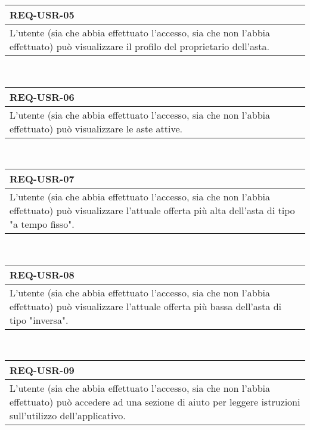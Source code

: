                 \begin{tabular}{|p{}|}
                    \hline
                    \multicolumn{1}{|l|}{\cellcolor{head}\textbf{REQ-USR-05}} \\
                    \hline
                    L'utente (sia che abbia effettuato l'accesso, sia che non l'abbia effettuato) può visualizzare il profilo del proprietario dell'asta. \\
                    \hline
                \end{tabular} \smallskip \\
                \begin{tabular}{|p{}|}
                    \hline
                    \multicolumn{1}{|l|}{\cellcolor{head}\textbf{REQ-USR-06}} \\
                    \hline
                    L'utente (sia che abbia effettuato l'accesso, sia che non l'abbia effettuato) può visualizzare le aste attive. \\
                    \hline
                \end{tabular} \smallskip \\
                \begin{tabular}{|p{}|}
                    \hline
                    \multicolumn{1}{|l|}{\cellcolor{head}\textbf{REQ-USR-07}} \\
                    \hline
                    L'utente (sia che abbia effettuato l'accesso, sia che non l'abbia effettuato) può visualizzare l'attuale offerta più alta dell'asta di tipo "a tempo fisso". \\
                    \hline
                \end{tabular} \smallskip \\
                \begin{tabular}{|p{}|}
                    \hline
                    \multicolumn{1}{|l|}{\cellcolor{head}\textbf{REQ-USR-08}} \\
                    \hline
                    L'utente (sia che abbia effettuato l'accesso, sia che non l'abbia effettuato) può visualizzare l'attuale offerta più bassa dell'asta di tipo "inversa". \\
                    \hline
                \end{tabular} \smallskip \\
                \begin{tabular}{|p{}|}
                    \hline
                    \multicolumn{1}{|l|}{\cellcolor{head}\textbf{REQ-USR-09}} \\
                    \hline
                    L'utente (sia che abbia effettuato l'accesso, sia che non l'abbia effettuato) può accedere ad una sezione di aiuto per leggere istruzioni sull'utilizzo dell'applicativo. \\
                    \hline
                \end{tabular} \smallskip \\
            
